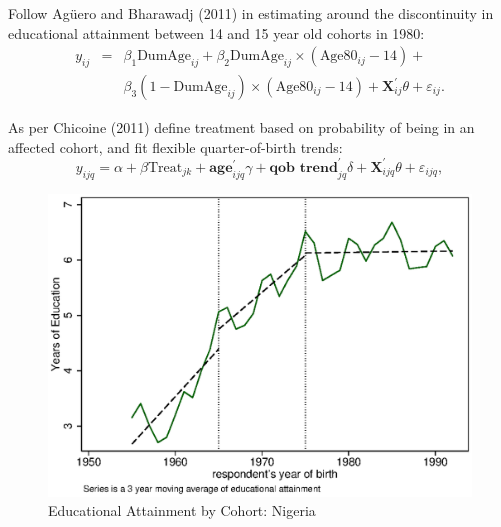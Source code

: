 \documentclass[10pt,letterpaper,subeqn, xcolor=table]{beamer}
\begin{document}
\begin{frame}[label=ZIMBABWE]
Follow Ag\"uero and Bharawadj (2011) in estimating around the discontinuity in educational
attainment between 14 and 15 year old cohorts in 1980:
\vspace{5mm}
\begin{eqnarray}
 \label{eqn:Zimbabwe}
 y_{ij}&=&\beta_1\text{DumAge}_{ij}+\beta_2\text{DumAge}_{ij}\times(\text{Age}80_{ij}-14)+ \\ \nonumber
 && \beta_3(1-\text{DumAge}_{ij})\times(\text{Age}80_{ij}-14)+\textbf{X}^\prime_{ij}\theta+\varepsilon_{ij}.
\end{eqnarray}
\vspace{5mm}
\hyperlink{ID}{}
\end{frame}

\begin{frame}[label=KENYA]
As per Chicoine (2011) define treatment based on probability of being in an affected
cohort, and fit flexible quarter-of-birth trends:
\vspace{5mm}
\begin{equation}
\label{eqn:Kenya}
 y_{ijq}=\alpha+\beta\text{Treat}_{jk}+\textbf{age}_{ijq}^\prime\gamma+\textbf{qob trend}_{jq}^\prime \delta +\textbf{X}^\prime_{ijq}\theta+\varepsilon_{ijq},
\end{equation}
\vspace{5mm}
\hyperlink{ID}{}
\end{frame}


\begin{frame}[label=NIGERIA_EDUC]
\begin{figure}[!htbp]
\begin{center}
\includegraphics[scale=0.7]{./figures/Nigeria_educ.eps}
\caption{Educational Attainment by Cohort: Nigeria}
\end{center}
\end{figure}
\hyperlink{ZIMBABWE_EDUC}{}
\end{frame}
\end{document}
